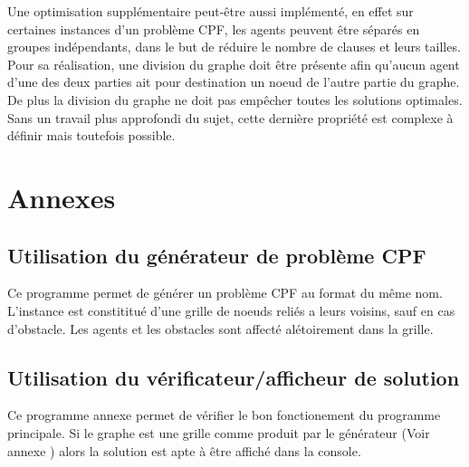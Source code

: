 \documentclass[french, 12pt, letterpaper]{article}
\theoremstyle{definition}
\theoremstyle{proposition}
\theoremstyle{example}
\begin{document}
    Une optimisation supplémentaire peut-être aussi implémenté, en effet sur certaines instances d'un problème CPF, les agents peuvent
    être séparés en groupes indépendants, dans le but de réduire le nombre de clauses et leurs tailles.
    Pour sa réalisation, une division du graphe doit être présente afin qu'aucun agent d'une des deux parties ait pour destination
    un noeud de l'autre partie du graphe. De plus la division du graphe ne doit pas empêcher toutes les solutions optimales. 
    Sans un travail plus approfondi du sujet, cette dernière propriété est complexe à définir mais toutefois possible.
    
    \newpage
    

    \section*{Annexes}

    \subsection*{Utilisation du générateur de problème CPF}
    \label{anx:generator}

    Ce programme permet de générer un problème CPF au format du même nom.
    L'instance est constititué d'une grille de noeuds reliés a leurs voisins, sauf en cas d'obstacle.
    Les agents et les obstacles sont affecté alétoirement dans la grille.

    \subsection*{Utilisation du vérificateur/afficheur de solution}
    \label{anx:verifier}

    Ce programme annexe permet de vérifier le bon fonctionement du programme principale.
    Si le graphe est une grille comme produit par le générateur (Voir annexe ) alors la solution est
    apte à être affiché dans la console.
\end{document}
